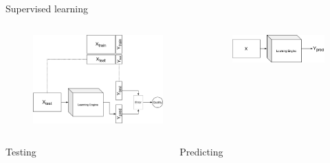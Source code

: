 \begin{frame}[allowframebreaks]{Supervised learning}
	\begin{columns}
		\begin{column}{.5\textwidth}
			\begin{figure}
				\includegraphics[width=1.\textwidth, center]{figures/ml_1_test}
				\caption*{}
			\end{figure}
		\end{column}
		\begin{column}{.5\textwidth}
			\begin{figure}
				\includegraphics[width=1.\textwidth, center]{figures/ml_1_infer}
				\caption*{}
			\end{figure}
		\end{column}
	\end{columns}
	\begin{columns}
		\begin{column}{.5\textwidth}
			\begin{center}
				Testing
			\end{center}
		\end{column}
		\begin{column}{.5\textwidth}
			\begin{center}
				Predicting
			\end{center}
		\end{column}
	\end{columns}
\end{frame}

